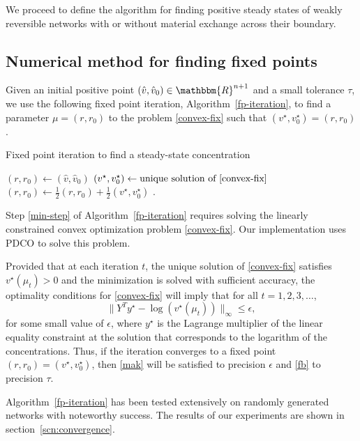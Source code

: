 \documentclass[smallextended]{svjour3}       %
\newcommand*{\0}{\mathbf{0}}
\newcommand*{\1}{\mathbf{1}}
\newcommand*{\R}{\mathbbm{R}}
\begin{document}
We proceed to define the algorithm for finding positive steady states of weakly
reversible networks with or without material exchange across their 
boundary.

\subsection{Numerical method for finding fixed points}

Given an initial positive point $(\hat v, \hat v_0) \in \R^{n+1}$ and a small
tolerance $\tau$, we use the following fixed point iteration,
Algorithm~\ref{fp-iteration}, to find a parameter $\mu = (r, r_0)$ to
the problem \eqref{convex-fix} such that $(v^\star,v_0^\star) =
(r,r_0)$.

\begin{algorithm}
\caption{Fixed point iteration to find a steady-state concentration}
\label{fp-iteration}
\begin{algorithmic}[1]
  \STATE $(r,r_0) \gets (\hat v,\hat v_0)$
  \STATE $(v^\star,v^\star_0)\gets \text{unique solution of \eqref{convex-fix}} $
		\label{min-step}
	\STATE $(r,r_0) \gets \frac{1}{2}(r,r_0) +\frac{1}{2}(v^\star,v^\star_0)$
  \ENDWHILE
  \label{fixpoint-alg}.
\end{algorithmic}
\end{algorithm}

Step \ref{min-step} of Algorithm~\ref{fp-iteration} requires
solving the linearly constrained convex optimization problem
\eqref{convex-fix}. Our implementation uses PDCO \cite{pdco} to
solve this problem.

Provided that at each iteration $t$, the unique solution of \eqref{convex-fix}
satisfies $v^\star(\mu_t)>0$ and the minimization is solved with sufficient
accuracy, the optimality conditions for \eqref{convex-fix} will imply that for
all $t = 1, 2, 3, \dots$,
\[
	\|Y^Ty^\star-\log(v^\star(\mu_t))\|_\infty \leq \epsilon,
\] 
for some small value of $\epsilon$, where $y^\star$ is the Lagrange
multiplier of the linear equality constraint at the solution that corresponds
to the logarithm of the concentrations. Thus, if the iteration
converges to a fixed point $(r,r_0) = (v^\star,v_0^\star)$, then
\eqref{mak} will be satisfied to precision $\epsilon$ and \eqref{fb}
to precision $\tau$.

Algorithm~\ref{fp-iteration} has been tested extensively on randomly generated
networks with noteworthy success. The results of our experiments are shown in
section~\ref{scn:convergence}.
\end{document}
